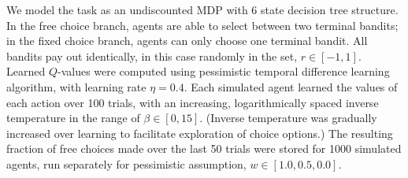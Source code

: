 \documentclass[11pt]{article} %
\begin{document}
We model the task as an undiscounted MDP with 6 state decision tree structure. In the free choice branch, agents are able to select between two terminal bandits; in the fixed choice branch, agents can only choose one terminal bandit. All bandits pay out identically, in this case randomly in the set, $r \in [-1, 1]$. Learned $Q$-values were computed using pessimistic temporal difference learning algorithm, with learning rate $\eta = 0.4$. Each simulated agent learned the values of each action over 100 trials, with an increasing, logarithmically spaced inverse temperature in the range of $\beta \in [0, 15]$. (Inverse temperature was gradually increased over learning to facilitate exploration of choice options.) The resulting fraction of free choices made over the last 50 trials were stored for 1000 simulated agents, run separately for pessimistic assumption, $w \in [1.0, 0.5, 0.0]$. 


\small{}
\end{document}
